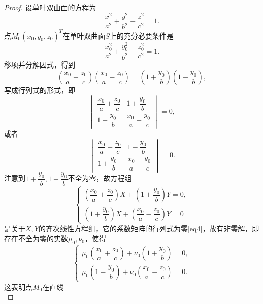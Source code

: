 \documentclass[12pt, a4paper,newtx]{ctexart}
\begin{document}
\begin{proof}
	设单叶双曲面的方程为\begin{equation}
		\dfrac{x^2}{a^2}+\dfrac{y^2}{b^2}-\dfrac{z^2}{c^2}=1.
	\end{equation}
	点$M_0(x_0,y_0,z_0)^T$在单叶双曲面$S$上的充分必要条件是\begin{equation}
		\dfrac{x_0^2}{a^2}+\dfrac{y_0^2}{b^2}-\dfrac{z_0^2}{c^2}=1.
	\end{equation}
	移项并分解因式，得到\begin{equation}
		\left(\dfrac{x_0}a+\dfrac{z_0}{c}\right)\left(\dfrac{x_0}{a}-\dfrac{z_0}{c}\right)=\left(1+\dfrac{y_0}{b}\right)\left(1-\dfrac{y_0}{b}\right),
	\end{equation}
	写成行列式的形式，即\begin{equation}\label{eq4}
			\begin{vmatrix}
			\dfrac{x_0}{a}+\dfrac{z_0}{c}&1+\dfrac{y_0}{b}\\1-\dfrac{y_0}{b}&\dfrac{x_0}{a}-\dfrac{y_0}{c}
		\end{vmatrix}=0,
	\end{equation}
	或者\begin{equation}\label{eq5}
		\begin{vmatrix}
			\dfrac{x_0}{a}+\dfrac{z_0}{c}&1-\dfrac{y_0}{b}\\1+\dfrac{y_0}{b}&\dfrac{x_0}{a}-\dfrac{y_0}{c}
		\end{vmatrix}=0. 
	\end{equation}
	注意到$1+\dfrac{y_0}{b},1-\dfrac{y_0}{b}$不全为零，故方程组\begin{equation}\label{equations}
		\begin{cases}
			\left(\dfrac{x_0}a+\dfrac{z_0}{c}\right)X+\left(1+\dfrac{y_0}{b}\right)Y=0,\\\left(1+\dfrac{y_0}{b}\right)X+\left(\dfrac{x_0}a-\dfrac{z_0}{c}\right)Y=0
		\end{cases}
	\end{equation}
	是关于$X,Y$的齐次线性方程组，它的系数矩阵的行列式为零\eqref{eq4}，故有非零解，即存在不全为零的实数$\mu_0,\nu_0$，使得
	\begin{equation}
		\begin{cases}
			\mu_0\left(\dfrac{x_0}a+\dfrac{z_0}{c}\right)+\nu_0\left(1+\dfrac{y_0}{b}\right)=0,\\\mu_0\left(1-\dfrac{y_0}{b}\right)+\nu_0\left(\dfrac{x_0}a-\dfrac{z_0}{c}\right)=0.
		\end{cases}
	\end{equation}
	这表明点$M_0$在直线\begin{equation}

\end{equation}
\end{proof}
\end{document}
